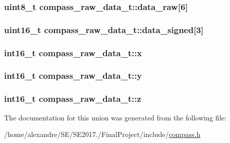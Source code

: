\subsubsection[{\texorpdfstring{data\+\_\+raw}{data_raw}}]{\setlength{\rightskip}{0pt plus 5cm}uint8\+\_\+t compass\+\_\+raw\+\_\+data\+\_\+t\+::data\+\_\+raw\mbox{[}6\mbox{]}}\hypertarget{unioncompass__raw__data__t_a2db6fcdbb55cdc519f8d585c2736c9ba}{}\label{unioncompass__raw__data__t_a2db6fcdbb55cdc519f8d585c2736c9ba}
\subsubsection[{\texorpdfstring{data\+\_\+signed}{data_signed}}]{\setlength{\rightskip}{0pt plus 5cm}uint16\+\_\+t compass\+\_\+raw\+\_\+data\+\_\+t\+::data\+\_\+signed\mbox{[}3\mbox{]}}\hypertarget{unioncompass__raw__data__t_ae37bda8d4edc5d2e648885c919e078a0}{}\label{unioncompass__raw__data__t_ae37bda8d4edc5d2e648885c919e078a0}
\subsubsection[{\texorpdfstring{x}{x}}]{\setlength{\rightskip}{0pt plus 5cm}int16\+\_\+t compass\+\_\+raw\+\_\+data\+\_\+t\+::x}\hypertarget{unioncompass__raw__data__t_a7e67aed6783296387dca0fada37da808}{}\label{unioncompass__raw__data__t_a7e67aed6783296387dca0fada37da808}
\subsubsection[{\texorpdfstring{y}{y}}]{\setlength{\rightskip}{0pt plus 5cm}int16\+\_\+t compass\+\_\+raw\+\_\+data\+\_\+t\+::y}\hypertarget{unioncompass__raw__data__t_a46f264b0e9a1b28784f45c7b8aabc456}{}\label{unioncompass__raw__data__t_a46f264b0e9a1b28784f45c7b8aabc456}
\subsubsection[{\texorpdfstring{z}{z}}]{\setlength{\rightskip}{0pt plus 5cm}int16\+\_\+t compass\+\_\+raw\+\_\+data\+\_\+t\+::z}\hypertarget{unioncompass__raw__data__t_a17996b57c24f32c439ec4ef9b1ab6e69}{}\label{unioncompass__raw__data__t_a17996b57c24f32c439ec4ef9b1ab6e69}


The documentation for this union was generated from the following file\+:\begin{DoxyCompactItemize}
\item 
/home/alexandre/\+S\+E/\+S\+E2017./\+Final\+Project/include/\hyperlink{compass_8h}{compass.\+h}\end{DoxyCompactItemize}
